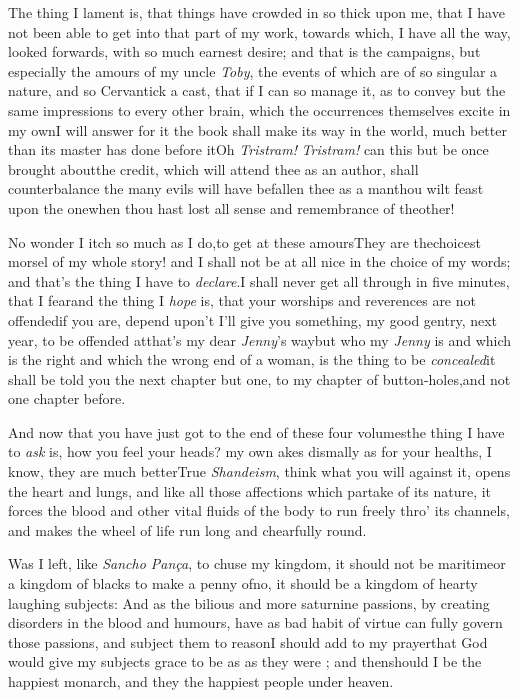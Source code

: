 \documentclass{article}
\begin{document}
The thing I lament is, that things have crowded in so thick upon
me, that I have not been able to get into that part of my work,
towards which, I have all the way, looked forwards, with so much
earnest desire; and that is the campaigns, but especially the
amours of my uncle \textit{Toby}, the events of which are of so
singular a nature, and so Cervantick a cast, that if I can so
manage it, as to convey but the same impressions to every other
brain, which the occurrences themselves excite in my own\tsh I
will answer for it the book shall make its way in the world, much
better than its master has done before it\tsh Oh
\textit{Tristram!} \textit{Tristram!} can this but be once brought
about\tsh the credit,
which will attend thee as an author, shall counterbalance the many
evils will have befallen thee as a man\tsh thou wilt feast
upon the one\tsh when thou hast lost all sense and
remembrance of the\break other!\tsh

No wonder I itch so much as I do,\break to get at these
amours\tsh They are the\break choicest morsel of my whole story! and
\break
I shall not be at all nice in the choice of my words;\tsh
and that’s the thing I have to \textit{declare}.\tsk I shall
never get all through in five minutes, that I fear\tsh and
the thing I \textit{hope} is, that your worships and
reverences are not offended\tsk if you are, depend upon’t
I’ll give you something, my good gentry, next year, to be
offended at\tsh that’s my dear \textit{Jenny}’s way\tsk but
who my \textit{Jenny} is\tsk\break
and which is the right and which the wrong end of a woman, is the thing to be
\textit{concealed}\tsk it shall be told you the next
chapter but one, to my chapter of button-holes,\tsk and not
one chapter before.


And now that you have just got to\break
the end of these four volumes\tsh the\break
thing I have to \textit{ask} is, how you feel\break
your heads? my own akes dismally\tsh\break
as for your healths, I know, they are\break
much better\tsh True \textit{Shandeism}, think\break
what you will against it, opens the\break
heart and lungs, and like all those affections which
partake of its nature, it forces the blood and other vital
fluids of the body to run freely thro’ its channels, and makes
the wheel of life run long and chearfully round.

Was I left, like \textit{Sancho Pança}, to\break
chuse my kingdom, it should not be\break
maritime\tsk or a kingdom of blacks to make a penny of\tsh no, it should\break
be a kingdom of hearty laughing subjects: And as the bilious and more
sa\-turnine passions, by creating disorders\break
in the blood and humours, have as bad\break
{}
habit of virtue can fully govern those passions, and subject them to
reason\tsh I should add to my prayer\tsk that God would give
my subjects grace to be as  as they were
; and then\break should I be the happiest monarch,
and they the happiest people under heaven.\tsk{}
\end{document}
